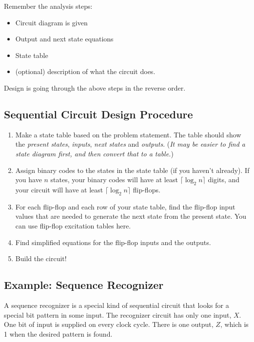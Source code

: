 Remember the analysis steps:
\begin{itemize}
  \item Circuit diagram is given
  \item Output and next state equations
  \item State table
  \item (optional) description of what the circuit does.
\end{itemize}
Design is going through the above steps in the reverse order.

\subsection{Sequential Circuit Design Procedure}
\label{subsec:seq-circ-design-procedure}

\begin{enumerate}[label=Step\ \arabic*:, leftmargin=*]
  \item Make a state table based on the problem statement. The table should show the \textit{present states}, \textit{inputs}, \textit{next states} and \textit{outputs}. (\textit{It may be easier to find a state diagram first, and then convert that to a table.})
  \item Assign binary codes to the states in the state table (if you haven't already). If you have $n$ states, your binary codes will have at least $\lceil \log_2 n \rceil$ digits, and your circuit will have at least $\lceil \log_2 n  \rceil$ flip-flops.
  \item For each flip-flop and each row of your state table, find the flip-flop input values that are needed to generate the next state from the present state. You can use flip-flop excitation tables here.
  \item Find simplified equations for the flip-flop inputs and the outputs.
  \item Build the circuit!
\end{enumerate}

\subsection{Example: Sequence Recognizer}
\label{subsec:example-seq-recozginer}

A sequence recognizer is a special kind of sequential circuit that looks for a special bit pattern in some input. The recognizer circuit has only one input, $X$. One bit of input is supplied on every clock cycle. There is one output, $Z$, which is 1 when the desired pattern is found. 


